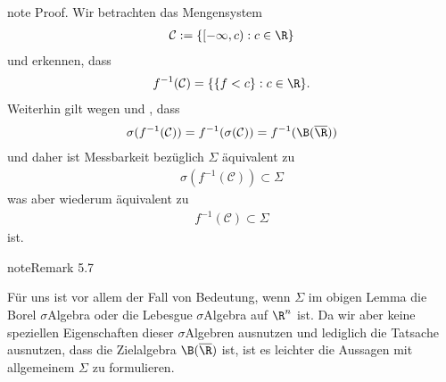 \documentclass[letterpaper,10pt,german]{jupyterBook}
\begin{document}
\begin{sphinxadmonition}{note}
\sphinxAtStartPar
Proof. Wir betrachten das Mengensystem
\begin{equation*}
\begin{split}\mathcal{C}:=\{[-\infty,c):c\in\R\}\end{split}
\end{equation*}
\sphinxAtStartPar
und erkennen, dass
\begin{equation*}
\begin{split}f^{-1}(\mathcal{C}) = \{\{f<c\}:c\in\R\}.\end{split}
\end{equation*}
\sphinxAtStartPar
Weiterhin gilt wegen {\hyperref[\detokenize{masstheorie/masstheorie:lem:genborel}]{}} und {\hyperref[\detokenize{masstheorie/lebesgue_integral:lem:changesigma}]{}}, dass
\begin{equation*}
\begin{split}\sigma(f^{-1}(\mathcal{C})) = f^{-1}(\sigma(\mathcal{C})) = f^{-1}(\B(\overline{\R}))\end{split}
\end{equation*}
\sphinxAtStartPar
und daher ist Messbarkeit bezüglich \(\Sigma\) äquivalent zu
\begin{equation*}
\begin{split}\sigma(f^{-1}(\mathcal{C})) \subset \Sigma\end{split}
\end{equation*}
\sphinxAtStartPar
was aber wiederum äquivalent zu
\begin{equation*}
\begin{split}f^{-1}(\mathcal{C}) \subset \Sigma\end{split}
\end{equation*}
\sphinxAtStartPar
ist.
\end{sphinxadmonition}
\label{masstheorie/lebesgue_integral:remark-5}
\begin{sphinxadmonition}{note}{Remark 5.7}



\sphinxAtStartPar
Für uns ist vor allem der Fall von Bedeutung, wenn \(\Sigma\) im obigen Lemma die Borel \(\sigma\)\sphinxhyphen{}Algebra oder die Lebesgue \(\sigma\)\sphinxhyphen{}Algebra auf \(\R^n\) ist. Da wir aber keine speziellen Eigenschaften dieser \(\sigma\)\sphinxhyphen{}Algebren ausnutzen und lediglich die Tatsache ausnutzen, dass die Zielalgebra \(\B(\overline{\R})\) ist, ist es leichter die Aussagen mit allgemeinem \(\Sigma\) zu formulieren.
\end{sphinxadmonition}
\end{document}
